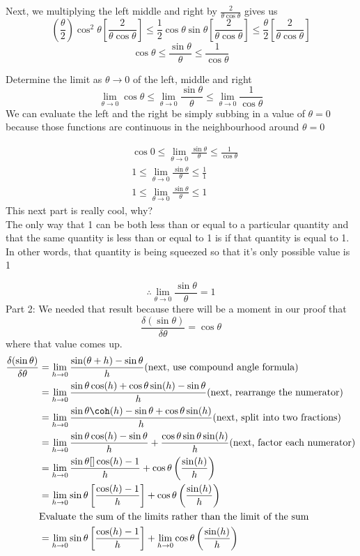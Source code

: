\documentclass{article}
\begin{document}
Next, we multiplying the left middle and right by $\frac{2}{\theta \cos \theta}$ gives us 
$$
    \left(\frac{\theta}{2}\right) \cos ^2 \theta \left[\frac{2}{\theta \cos \theta}\right] \leq \frac{1}{2}\cos \theta \sin \theta \left[\frac{2}{\theta \cos \theta}\right] \leq \frac{\theta}{2} \left[\frac{2}{\theta \cos \theta}\right]
$$
$$\cos \theta \leq \frac{\sin \theta}{\theta} \leq \frac{1}{\cos \theta}$$

Determine the limit as $\theta \to 0$ of the left, middle and right
$$\lim_{\theta \to 0}\cos \theta \leq \lim_{\theta \to 0}\frac{\sin \theta}{\theta} \leq \lim_{\theta \to 0}\frac{1}{\cos \theta}$$
We can evaluate the left and the right be simply subbing in a value of $\theta=0$ because those functions are continuous in the neighbourhood around $\theta=0$

\begin{align*}
   & \cos 0 \leq \lim_{\theta \to 0} \frac{\sin \theta}{\theta} \leq \frac{1}{\cos \theta}\\
   & 1 \leq \lim_{\theta \to 0} \frac{\sin \theta}{\theta} \leq \frac{1}{1}\\
   & 1 \leq \lim_{\theta \to 0} \frac{\sin \theta}{\theta} \leq 1
\end{align*}
This next part is really cool, why?\\
The only way that 1 can be both less than or equal to a particular quantity and that the same quantity is less than or equal to 1 is if that quantity is equal to 1.\\
In other words, that quantity is being squeezed so that it’s only possible value is 1

$$\therefore \lim_{\theta \to 0}\frac{\sin \theta}{\theta}=1$$
Part 2:  We needed that result because there will be a moment in our proof that $$\frac{\delta(\sin \theta)}{\delta \theta}=\cos \theta$$ where that value comes up.
\begin{align*}
    \frac{\delta (\sin \theta)}{\delta \theta}&=\lim_{h \to 0}\frac{\sin(\theta+h)-\sin \theta}{h} \text{(next, use compound angle formula)}\\
    &=\lim_{h\to 0}\frac{\sin \theta \cos (h)+\cos \theta \sin(h)-\sin \theta}{h} \text{(next, rearrange the numerator)}\\
    &= \lim_{h\to 0}\frac{\sin \theta \coh (h)-\sin \theta +\cos \theta \sin(h)}{h} \text{(next, split into two fractions)}\\ 
    &=\lim_{h \to 0} \frac{\sin \theta \cos(h)-\sin \theta }{h}+\frac{\cos \theta \sin \theta \sin(h)}{h} \text{(next, factor each numerator)}\\
    &=\lim_{h \to 0} \frac{\sin \theta []\cos (h)-1}{h}+\cos \theta \left(\frac{\sin (h)}{h}\right)\\
    &=\lim_{h \to 0} \sin \theta \left[\frac{\cos (h)-1}{h}\right]+ \cos \theta \left(\frac{\sin (h)}{h}\right)\\    
    &\text{Evaluate the sum of the limits rather than the limit of the sum}\\
    &=\lim_{h \to 0} \sin \theta \left[\frac{\cos (h)-1}{h}\right]+ \lim_{h \to 0}\cos \theta \left(\frac{\sin (h)}{h}\right)\\    
\end{align*}
\end{document}
